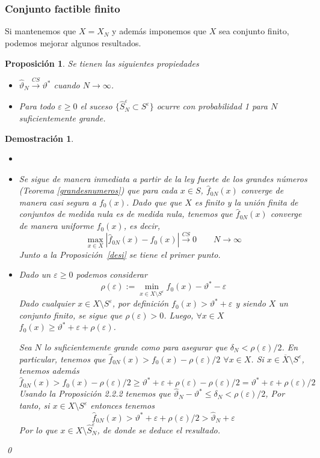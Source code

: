 \documentclass[twoside,a4paper,openright,12pt]{book}
\newtheorem{prop}{Proposici\'on}[section]
\newtheorem*{dem}{Demostración}
\providecommand{\abs}[1]{\left|{#1}\right|}
\providecommand{\convcs}{\xrightarrow{CS}}
\newcommand{\fn}{\hat{f}_{0N}}
\newcommand{\X}{\overline{X}}
\newcommand{\va}{\hat{\vartheta}_N}
\begin{document}
\subsubsection*{Conjunto factible finito}
Si mantenemos que $X=\hat{X}_N$ y además imponemos que $X$ sea conjunto finito, podemos mejorar algunos resultados.
\begin{prop}
Se tienen las siguientes propiedades
\begin{itemize}
\item $\va\convcs \vartheta^*$ cuando $N\to \infty$.
\item Para todo $\varepsilon\geq 0$ el suceso $\{\hat{S}^\varepsilon_N\subset S^\varepsilon\}$ ocurre con probabilidad 1 para $N$ suficientemente grande.
\end{itemize}
\end{prop}
\begin{dem}
\begin{itemize}
\item[]
\item Se sigue de manera inmediata a partir de la ley fuerte de los grandes números (Teorema \ref{grandesnumeros}) que para cada $x\in S$, $\fn(x)$ converge de manera casi segura a $f_{0}(x)$. Dado que que $X$ es finito y la unión finita de conjuntos de medida nula es de medida nula, tenemos que $\fn(x)$ converge de manera uniforme $f_0(x)$, es decir,
$$
\max_{x\in X}\abs{\hat{f}_{0N}(x)-f_0(x)}\convcs 0 \qquad N\to \infty
$$
Junto a la Proposición~\ref{desi} se tiene el primer punto.
\item Dado un $\varepsilon\geq 0$ podemos considerar
$$
\rho(\varepsilon):=\min_{x\in X\setminus S^\varepsilon}f_{0}(x)-\vartheta^*-\varepsilon
$$
Dado cualquier $x\in X\setminus S^\varepsilon$, por definición $f_0(x)>\vartheta^*+\varepsilon$ y siendo $X$ un conjunto finito, se sigue que $\rho(\varepsilon)>0$. Luego, $\forall x \in X$ $f_0(x)\geq \vartheta^* +\varepsilon+\rho(\varepsilon)$.

Sea $N$ lo suficientemente grande como para asegurar que $\delta_N<\rho(\varepsilon)/2$. En particular, tenemos que $\hat{f}_{0N}(x) > f_0(x)-\rho(\varepsilon)/2$ $\forall x \in X$. Si $x\in \X\setminus S^\varepsilon$, tenemos además 
$$
\hat{f}_{0N}(x)> f_0(x)-\rho(\varepsilon)/2 \geq  \vartheta^* +\varepsilon+\rho(\varepsilon) - \rho(\varepsilon)/2 =  \vartheta^* +\varepsilon+\rho(\varepsilon)/2
$$
Usando la Proposición 2.2.2 tenemos que $\hat{\vartheta}_N-\vartheta^*\leq \delta_N < \rho(\varepsilon)/2$, Por tanto, si $x\in X\setminus S^\varepsilon$ entonces tenemos
$$
\hat{f}_{0N}(x)> \vartheta^* +\varepsilon+\rho(\varepsilon)/2 > \hat{\vartheta}_N + \varepsilon
$$
Por lo que $x\in X\setminus \hat{S}^\varepsilon_N$, de donde se deduce el resultado.
\end{itemize} 
\qed
\end{dem}
\end{document}
